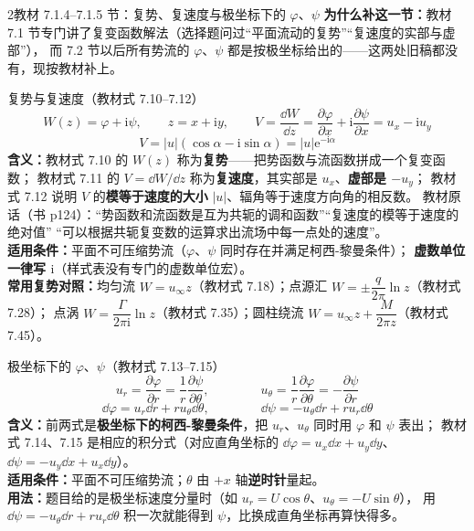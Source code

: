 \begin{kaodian}{2}{教材 7.1.4--7.1.5 节：复势、复速度与极坐标下的 $\varphi$、$\psi$}
\textbf{为什么补这一节：}教材 7.1 节专门讲了复变函数解法（选择题问过“平面流动的复势”“复速度的实部与虚部”），
而 7.2 节以后所有势流的 $\varphi$、$\psi$ 都是按极坐标给出的——这两处旧稿都没有，现按教材补上。

\begin{gongshi}{复势与复速度（教材式 7.10--7.12）}
\[ W(z)=\varphi+\mathrm{i}\psi,\qquad z=x+\mathrm{i}y,\qquad
   V=\frac{\dd W}{\dd z}=\frac{\partial\varphi}{\partial x}+\mathrm{i}\frac{\partial\psi}{\partial x}=u_x-\mathrm{i}u_y \]
\[ V=|u|\left(\cos\alpha-\mathrm{i}\sin\alpha\right)=|u|\mathrm{e}^{-\mathrm{i}\alpha} \]
\textbf{含义：}教材式 7.10 的 $W(z)$ 称为\textbf{复势}——把势函数与流函数拼成一个复变函数；
教材式 7.11 的 $V=\dd W/\dd z$ 称为\textbf{复速度}，其实部是 $u_x$、\textbf{虚部是 $-u_y$}；
教材式 7.12 说明 $V$ 的\textbf{模等于速度的大小} $|u|$、辐角等于速度方向角的相反数。
教材原话（书 p124）：“势函数和流函数是互为共轭的调和函数”“复速度的模等于速度的绝对值”
“可以根据共轭复变数的运算求出流场中每一点处的速度”。\\
\textbf{适用条件：}平面不可压缩势流（$\varphi$、$\psi$ 同时存在并满足柯西-黎曼条件）；
\textbf{虚数单位一律写 $\mathrm{i}$}（样式表没有专门的虚数单位宏）。\\
\textbf{常用复势对照：}均匀流 $W=u_\infty z$（教材式 7.18）；点源汇 $W=\pm\dfrac{q}{2\pi}\ln z$（教材式 7.28）；
点涡 $W=\dfrac{\Gamma}{2\pi\mathrm{i}}\ln z$（教材式 7.35）；圆柱绕流 $W=u_\infty z+\dfrac{M}{2\pi z}$（教材式 7.45）。
\end{gongshi}

\begin{gongshi}{极坐标下的 $\varphi$、$\psi$（教材式 7.13--7.15）}
\[ u_r=\frac{\partial\varphi}{\partial r}=\frac1r\frac{\partial\psi}{\partial\theta},\qquad\qquad
   u_\theta=\frac1r\frac{\partial\varphi}{\partial\theta}=-\frac{\partial\psi}{\partial r} \]
\[ \dd\varphi=u_r\dd r+r u_\theta\dd\theta,\qquad\qquad
   \dd\psi=-u_\theta\dd r+r u_r\dd\theta \]
\textbf{含义：}前两式是\textbf{极坐标下的柯西-黎曼条件}，把 $u_r$、$u_\theta$ 同时用 $\varphi$ 和 $\psi$ 表出；
教材式 7.14、7.15 是相应的积分式（对应直角坐标的 $\dd\varphi=u_x\dd x+u_y\dd y$、$\dd\psi=-u_y\dd x+u_x\dd y$）。\\
\textbf{适用条件：}平面不可压缩势流；$\theta$ 由 $+x$ 轴\textbf{逆时针}量起。\\
\textbf{用法：}题目给的是极坐标速度分量时（如 $u_r=U\cos\theta$、$u_\theta=-U\sin\theta$），
用 $\dd\psi=-u_\theta\dd r+r u_r\dd\theta$ 积一次就能得到 $\psi$，比换成直角坐标再算快得多。
\end{gongshi}


\end{kaodian}
